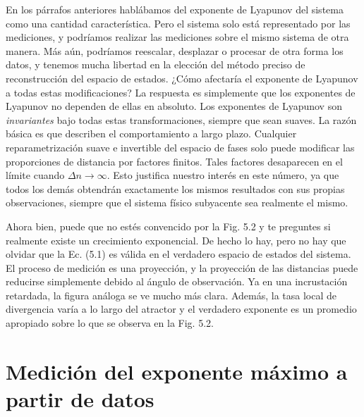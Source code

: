 \documentclass[10pt,a4paper]{book}
\begin{document}
En los párrafos anteriores hablábamos del exponente de Lyapunov del sistema como una cantidad característica. Pero el sistema solo está representado por las mediciones, y podríamos realizar las mediciones sobre el mismo sistema de otra manera. Más aún, podríamos reescalar, desplazar o procesar de otra forma los datos, y tenemos mucha libertad en la elección del método preciso de reconstrucción del espacio de estados. ¿Cómo afectaría el exponente de Lyapunov a todas estas modificaciones? La respuesta es simplemente que los exponentes de Lyapunov no dependen de ellas en absoluto. Los exponentes de Lyapunov son \textit{invariantes} bajo todas estas transformaciones, siempre que sean suaves. La razón básica es que describen el comportamiento a largo plazo. Cualquier reparametrización suave e invertible del espacio de fases solo puede modificar las proporciones de distancia por factores finitos. Tales factores desaparecen en el límite cuando $\Delta n \to \infty$. Esto justifica nuestro interés en este número, ya que todos los demás obtendrán exactamente los mismos resultados con sus propias observaciones, siempre que el sistema físico subyacente sea realmente el mismo. 

\bigskip

Ahora bien, puede que no estés convencido por la Fig. 5.2 y te preguntes si realmente existe un crecimiento exponencial. De hecho lo hay, pero no hay que olvidar que la Ec. (5.1) es válida en el verdadero espacio de estados del sistema. El proceso de medición es una proyección, y la proyección de las distancias puede reducirse simplemente debido al ángulo de observación. Ya en una incrustación retardada, la figura análoga se ve mucho más clara. Además, la tasa local de divergencia varía a lo largo del atractor y el verdadero exponente es un promedio apropiado sobre lo que se observa en la Fig. 5.2.

\section{Medición del exponente máximo a partir de datos}
\end{document}

